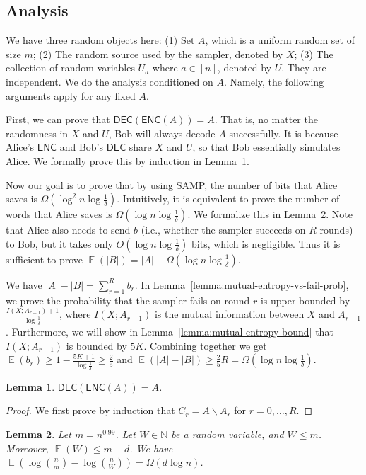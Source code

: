 \documentclass[10pt]{article}
\newtheorem{lemma}{Lemma}
\DeclareMathOperator*{\E}{\mathbb{E}}
\newcommand{\samp}{\textsf{SAMP}\xspace}
\newcommand{\enc}{\textsf{ENC}\xspace}
\newcommand{\dec}{\textsf{DEC}\xspace}
\begin{document}
\subsection{Analysis}

We have three random objects here: (1) Set $A$, which is a uniform random set of size $m$; (2) The random source used by the sampler, denoted by $X$; (3) The collection of random variables $U_a$ where $a\in [n]$, denoted by $U$. They are independent. We do the analysis conditioned on $A$. Namely, the following arguments apply for any fixed $A$. 

First, we can prove that $\dec(\enc(A))=A$. That is, no matter the randomness in $X$ and $U$, Bob will always decode $A$ successfully. It is because Alice's $\enc$ and Bob's $\dec$ share $X$ and $U$, so that Bob essentially simulates Alice. We formally prove this by induction in Lemma~\ref{lemma:zero-fail-prob}. 

Now our goal is to prove that by using \samp, the number of bits that Alice saves is $\Omega(\log^2 n \log\frac{1}{\delta})$. Intuitively, it is equivalent to prove the number of words that Alice saves is $\Omega(\log n \log\frac{1}{\delta})$.
We formalize this in Lemma~\ref{lemma:bits-saving}. Note that Alice also needs to send $b$ (i.e., whether the sampler succeeds on $R$ rounds) to Bob, but it takes only $O(\log n \log\frac{1}{\delta})$ bits, which is negligible. Thus it is sufficient to prove $\E(|B|)=|A|-\Omega(\log n \log\frac{1}{\delta})$. 

We have $|A|-|B|=\sum_{r=1}^{R}b_r$. 
In Lemma~\ref{lemma:mutual-entropy-vs-fail-prob}, we prove the probability that the sampler fails on round $r$ is upper bounded by $\frac{I(X;A_{r-1})+1}{\log \frac{1}{\delta}}$, where $I(X;A_{r-1})$ is the mutual information between $X$ and $A_{r-1}$. 
Furthermore, we will show in Lemma~\ref{lemma:mutual-entropy-bound} that $I(X;A_{r-1})$ is bounded by $5K$.
Combining together we get $\E(b_r)\ge 1-\frac{5K+1}{\log \frac{1}{\delta}}\ge \frac{2}{5}$ and $\E(|A|-|B|)\ge \frac{2}{5}R=\Omega(\log n \log\frac{1}{\delta})$. 

\begin{lemma}\label{lemma:zero-fail-prob}
  $\dec(\enc(A))=A$.
\end{lemma}

\begin{proof}
  We first prove by induction that $C_r=A\backslash A_r$ for $r=0,\ldots, R$.   
\end{proof}

\begin{lemma} \label{lemma:bits-saving}
  Let $m=n^{0.99}$. Let $W\in \mathbb{N}$ be a random variable, and $W\le m$. Moreover, $\E(W)\le m-d$. We have $\E(\log {n \choose m}-\log {n \choose W})=\Omega(d \log n)$.
\end{lemma}
\end{document}
